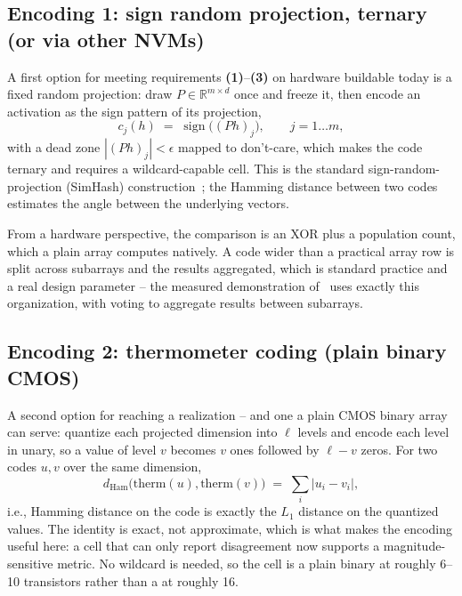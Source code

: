 \subsection{Encoding 1: sign random projection, ternary (or via other
NVMs)}
\label{subsec:SignRP}
A first option for meeting requirements {\bf (1)}--{\bf (3)} on
hardware buildable today is a fixed random projection: draw
$P \in \mathbb{R}^{m \times d}$ once and freeze it, then encode an
activation as the sign pattern of its projection,
%
\begin{equation}
c_j(h) \;=\; \operatorname{sign}\!\big( (Ph)_j \big), \qquad j = 1 \ldots m,
\label{eq:signrp}
\end{equation}
%
with a dead zone $|(Ph)_j| < \epsilon$ mapped to don't-care, which makes
the code ternary and requires a wildcard-capable cell. This is the
standard sign-random-projection (SimHash)
construction~\cite{charikar2002simhash}; the Hamming distance between
two codes estimates the angle between the underlying
vectors.

From a hardware perspective, the comparison is an XOR plus a
population count, which a plain
\cam array computes natively. A code wider than a practical array row
is split across subarrays and the results aggregated, which is
standard practice and a real design parameter -- the measured
\fefet \cam demonstration of~\cite{kazemi2022hdcfefet} uses exactly
this organization, with voting to aggregate results between
subarrays.

\subsection{Encoding 2: thermometer coding (plain binary CMOS)}
\label{subsec:Thermometer}
A second option for reaching a \cam realization -- and one a plain
CMOS binary array can serve: quantize each projected dimension into
$\ell$ levels and encode each
level in unary, so a value of level $v$ becomes $v$ ones followed by
$\ell-v$ zeros. For two codes $u,v$ over the same dimension,
%
\begin{equation}
d_{\mathrm{Ham}}\big(\mathrm{therm}(u), \mathrm{therm}(v)\big)
\;=\; \sum_i \big| u_i - v_i \big|,
\label{eq:thermo}
\end{equation}
%
i.e., Hamming distance on the code is exactly the $L_1$ distance on the
quantized values. The identity is exact, not approximate, which is what
makes the encoding useful here: a cell that can only report disagreement
now supports a magnitude-sensitive metric. No wildcard is needed, so
the cell is a plain binary \cam at roughly 6--10 transistors rather than
a \tcam at roughly 16.

